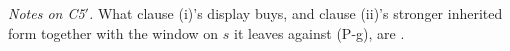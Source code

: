 \noindent\emph{Notes on C5$'$.} What clause (i)'s display buys, and clause (ii)'s stronger inherited form
together with the window on $s$ it leaves against (P-g), are .

%
%
%
%
%
